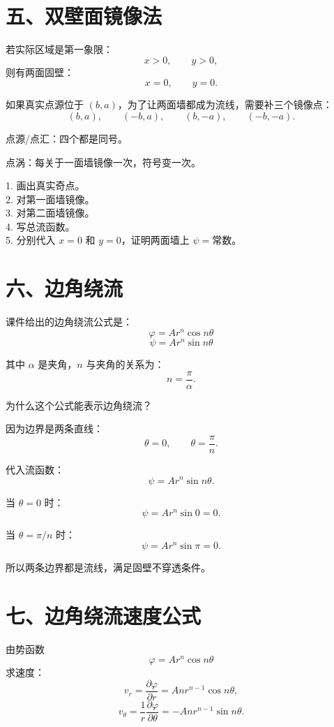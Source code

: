 \documentclass[11pt,a4paper]{ctexart}
\begin{document}
\section*{五、双壁面镜像法}

若实际区域是第一象限：
\[
x>0,\qquad y>0,
\]
则有两面固壁：
\[
x=0,\qquad y=0.
\]

如果真实点源位于 $(b,a)$，为了让两面墙都成为流线，需要补三个镜像点：
\[
(b,a),\qquad (-b,a),\qquad (b,-a),\qquad (-b,-a).
\]

点源/点汇：四个都是同号。

点涡：每关于一面墙镜像一次，符号变一次。

\begin{tcolorbox}[colback=green!4,colframe=green!45!black,title=双壁面题的标准流程]
1. 画出真实奇点。\\
2. 对第一面墙镜像。\\
3. 对第二面墙镜像。\\
4. 写总流函数。\\
5. 分别代入 $x=0$ 和 $y=0$，证明两面墙上 $\psi=\text{常数}$。
\end{tcolorbox}

\section*{六、边角绕流}

课件给出的边角绕流公式是：
\[
\boxed{\varphi=A r^n\cos n\theta}
\]
\[
\boxed{\psi=A r^n\sin n\theta}
\]

其中 $\alpha$ 是夹角，$n$ 与夹角的关系为：
\[
\boxed{n=\frac{\pi}{\alpha}}.
\]

为什么这个公式能表示边角绕流？

因为边界是两条直线：
\[
\theta=0,\qquad \theta=\frac{\pi}{n}.
\]

代入流函数：
\[
\psi=A r^n\sin n\theta.
\]

当 $\theta=0$ 时：
\[
\psi=Ar^n\sin 0=0.
\]

当 $\theta=\pi/n$ 时：
\[
\psi=Ar^n\sin \pi=0.
\]

所以两条边界都是流线，满足固壁不穿透条件。

\section*{七、边角绕流速度公式}

由势函数
\[
\varphi=A r^n\cos n\theta
\]
求速度：
\[
v_r=\frac{\partial\varphi}{\partial r}
=Anr^{n-1}\cos n\theta,
\]
\[
v_\theta=\frac{1}{r}\frac{\partial\varphi}{\partial\theta}
=-Anr^{n-1}\sin n\theta.
\]
\end{document}
